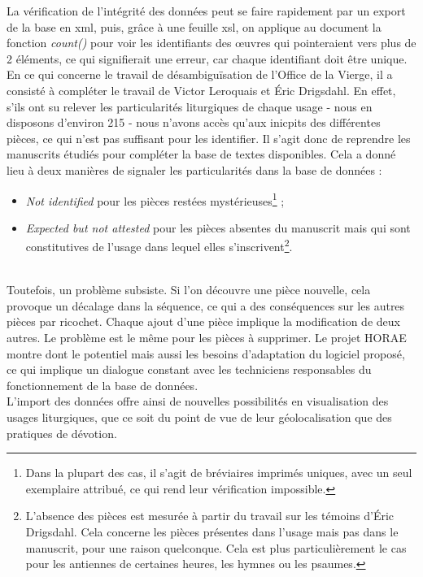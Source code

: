 \documentclass[a4paper,12pt,twoside]{book}
\begin{document}
La vérification de l’intégrité des données peut se faire rapidement par un export de la base en xml, puis, grâce à une feuille xsl, on applique au document la fonction \textit{count()} pour voir les identifiants des œuvres qui pointeraient vers plus de 2 éléments, ce qui signifierait une erreur, car chaque identifiant doit être unique.\\

En ce qui concerne le travail de désambiguïsation de l'Office de la Vierge, il a consisté à compléter le travail de Victor Leroquais et Éric Drigsdahl. En effet, s'ils ont su relever les particularités liturgiques de chaque usage - nous en disposons d'environ 215 - nous n'avons accès qu'aux inicpits des différentes pièces, ce qui n'est pas suffisant pour les identifier. Il s'agit donc de reprendre les manuscrits étudiés pour compléter la base de textes disponibles. Cela a donné lieu à deux manières de signaler les particularités dans la base de données : 
\begin{itemize}
    \item \og \textit{Not identified}\fg{} pour les pièces restées mystérieuses\footnote{Dans la plupart des cas, il s'agit de bréviaires imprimés uniques, avec un seul exemplaire attribué, ce qui rend leur vérification impossible.} ;
    \item \og \textit{Expected but not attested}\fg{} pour les pièces absentes du manuscrit mais qui sont constitutives de l'usage dans lequel elles s'inscrivent\footnote{L'absence des pièces est mesurée à partir du travail sur les témoins d'Éric Drigsdahl. Cela concerne les pièces présentes dans l'usage mais pas dans le manuscrit, pour une raison quelconque. Cela est plus particulièrement le cas pour les antiennes de certaines heures, les hymnes ou les psaumes.}.
\end{itemize}\\

Toutefois, un problème subsiste. Si l’on découvre une pièce nouvelle, cela provoque un décalage dans la séquence, ce qui a des conséquences sur les autres pièces par ricochet. Chaque ajout d’une pièce implique la modification de deux autres. Le problème est le même pour les pièces à supprimer. Le projet HORAE montre dont le potentiel mais aussi les besoins d’adaptation du logiciel proposé, ce qui implique un dialogue constant avec les techniciens responsables du fonctionnement de la base de données.\\

L'import des données offre ainsi de nouvelles possibilités en visualisation des usages liturgiques, que ce soit du point de vue de leur géolocalisation que des pratiques de dévotion. 
	
\end{document}
